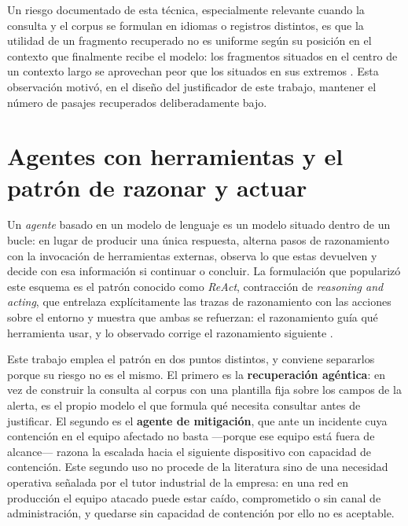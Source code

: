 Un riesgo documentado de esta técnica, especialmente relevante cuando la consulta y el corpus se
formulan en idiomas o registros distintos, es que la utilidad de un fragmento recuperado no es
uniforme según su posición en el contexto que finalmente recibe el modelo: los fragmentos situados
en el centro de un contexto largo se aprovechan peor que los situados en sus extremos
\cite{liu2023lost}. Esta observación motivó, en el diseño del justificador de este trabajo,
mantener el número de pasajes recuperados deliberadamente bajo.

\section{Agentes con herramientas y el patrón de razonar y actuar}
\label{sec:agentes}

Un \emph{agente} basado en un modelo de lenguaje es un modelo situado dentro de un bucle: en lugar
de producir una única respuesta, alterna pasos de razonamiento con la invocación de herramientas
externas, observa lo que estas devuelven y decide con esa información si continuar o concluir. La
formulación que popularizó este esquema es el patrón conocido como \emph{ReAct}, contracción de
\emph{reasoning and acting}, que entrelaza explícitamente las trazas de razonamiento con las
acciones sobre el entorno y muestra que ambas se refuerzan: el razonamiento guía qué herramienta
usar, y lo observado corrige el razonamiento siguiente \cite{yao2023react}.

Este trabajo emplea el patrón en dos puntos distintos, y conviene separarlos porque su riesgo no es
el mismo. El primero es la \textbf{recuperación agéntica}: en vez de construir la consulta al corpus
con una plantilla fija sobre los campos de la alerta, es el propio modelo el que formula qué
necesita consultar antes de justificar. El segundo es el \textbf{agente de mitigación}, que ante un
incidente cuya contención en el equipo afectado no basta ---porque ese equipo está fuera de
alcance--- razona la escalada hacia el siguiente dispositivo con capacidad de contención. Este
segundo uso no procede de la literatura sino de una necesidad operativa señalada por el tutor
industrial de la empresa: en una red en producción el equipo atacado puede estar caído,
comprometido o sin canal de administración, y quedarse sin capacidad de contención por ello no es
aceptable.

